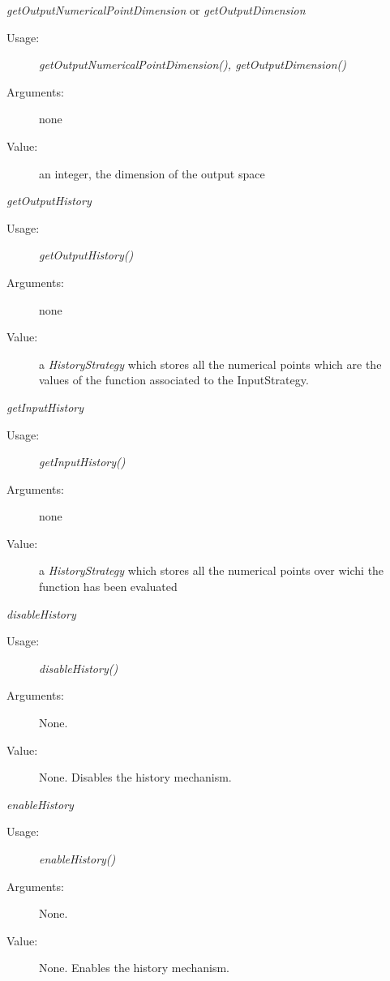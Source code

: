 \begin{description}
\begin{description}
\item \textit{getOutputNumericalPointDimension} or   \textit{getOutputDimension}
\begin{description}
\item[Usage:] \textit{getOutputNumericalPointDimension(), getOutputDimension()}
\item[Arguments:] none
\item[Value:] an integer, the dimension of the output space
\end{description}
\bigskip

\item \textit{getOutputHistory}
\begin{description}
\item[Usage:] \textit{getOutputHistory()}
\item[Arguments:] none
\item[Value:] a \textit{HistoryStrategy} which stores all the numerical points which are the values of the function associated to the InputStrategy.
\end{description}
\bigskip

\item \textit{getInputHistory}
\begin{description}
\item[Usage:] \textit{getInputHistory()}
\item[Arguments:] none
\item[Value:] a \textit{HistoryStrategy} which stores all the numerical points over wichi the function has been evaluated
\end{description}
\bigskip

\item \textit{disableHistory}
\begin{description}
\item[Usage:] \textit{disableHistory()}
\item[Arguments:] None.
\item[Value:] None. Disables the history mechanism.
\end{description}
\bigskip

\item \textit{enableHistory}
\begin{description}
\item[Usage:] \textit{enableHistory()}
\item[Arguments:] None.
\item[Value:] None. Enables the history mechanism.
\end{description}
\bigskip


\end{description}
\end{description}
